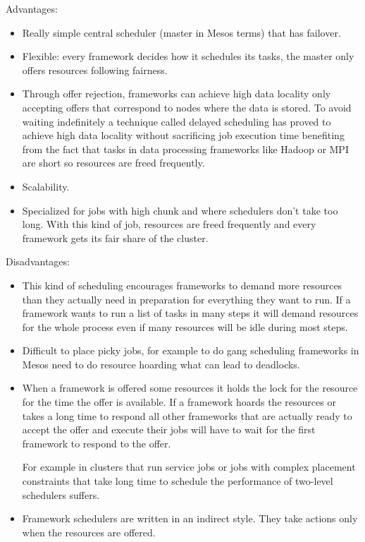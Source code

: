 \documentclass{article}                     %
\begin{document}

Advantages:

\begin{itemize}\itemsep4pt
  \item
  Really simple central scheduler (master in Mesos terms) that has
  failover.
 \item
  Flexible: every framework decides how it schedules its tasks, the
  master only offers resources following fairness.
 \item
  Through offer rejection, frameworks can achieve high data locality
  only accepting offers that correspond to nodes where the data is
  stored. To avoid waiting indefinitely a technique called delayed
  scheduling \cite{zaharia_delay_2010} has proved to achieve high data locality without
  sacrificing job execution time benefiting from the fact that tasks in
  data processing frameworks like Hadoop or MPI are short so resources
  are freed frequently.
 \item Scalability.
 \item Specialized for jobs with high chunk and where schedulers don't take
too long. With this kind of job, resources are freed frequently and
every framework gets its fair share of the cluster.
\end{itemize}

Disadvantages:

\begin{itemize}\itemsep4pt
 \item This kind of scheduling encourages frameworks to demand more
   resources than they actually need in preparation for everything
   they want to run. If a framework wants to run a list of tasks in
   many steps it will demand resources for the whole process even if
   many resources will be idle during most steps.
 \item Difficult to place picky jobs, for example to do gang scheduling
frameworks in Mesos need to do resource hoarding what can lead to
deadlocks.
 \item When a framework is offered some resources it
holds the lock for the resource for the time the offer is
available. If a framework hoards the resources or takes a long
time to respond all other frameworks that are actually ready to accept
the offer and execute their jobs will have to wait for the first
framework to respond to the offer.

For example in clusters that run service jobs or jobs with complex
placement constraints that take long time to schedule the performance
of two-level schedulers suffers.

 \item Framework schedulers are written in an indirect style. They
  take actions only when the resources are offered. 
\end{itemize}
\end{document}
